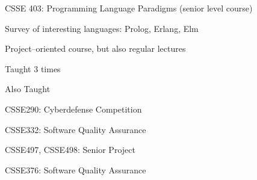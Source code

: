 \documentclass[10pt]{article}
\newenvironment{outerlist}[1][\enskip\textbullet]%
        {\begin{itemize}[#1]}{\end{itemize}%
         \vspace{-.6\baselineskip}}
\newenvironment{innerlist}[1][\enskip\textbullet]%
        {\begin{compactitem}[#1]}{\end{compactitem}}
\newcommand{\blankline}{\quad\pagebreak[2]}
\begin{document}
\begin{outerlist}
    CSSE 403: Programming Language Paradigms (senior level course)
    \begin{innerlist}
    \item Survey of interesting languages: Prolog, Erlang, Elm
    \item Project--oriented course, but also regular lectures
    \item Taught 3 times
    \end{innerlist}

    Also Taught
    \begin{innerlist}
    \item CSSE290: Cyberdefense Competition
    \item CSSE332: Software Quality Assurance
    \item CSSE497, CSSE498: Senior Project
    \item CSSE376: Software Quality Assurance
    \end{innerlist}


\end{outerlist}

\blankline
\end{document}
